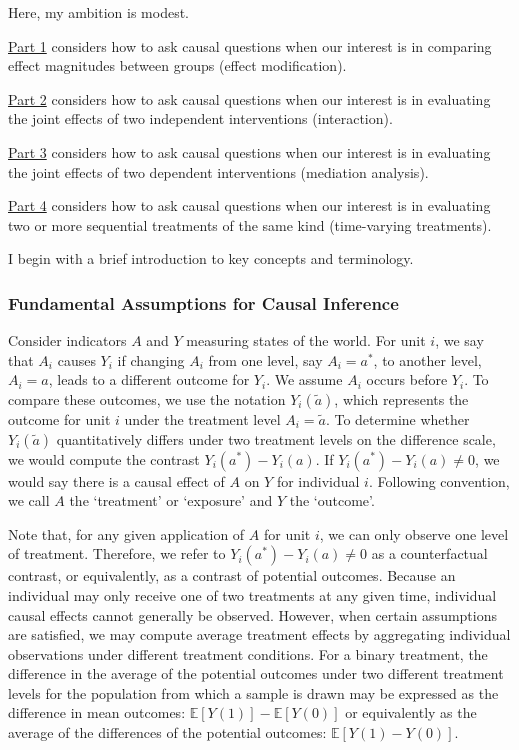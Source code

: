 \documentclass[
  single column]{article}
\begin{document}
Here, my ambition is modest.

\hyperref[id-sec-1]{Part 1} considers how to ask causal questions when
our interest is in comparing effect magnitudes between groups (effect
modification).

\hyperref[id-sec-2]{Part 2} considers how to ask causal questions when
our interest is in evaluating the joint effects of two independent
interventions (interaction).

\hyperref[id-sec-3]{Part 3} considers how to ask causal questions when
our interest is in evaluating the joint effects of two dependent
interventions (mediation analysis).

\hyperref[id-sec-4]{Part 4} considers how to ask causal questions when
our interest is in evaluating two or more sequential treatments of the
same kind (time-varying treatments).

I begin with a brief introduction to key concepts and terminology.

\subsubsection{Fundamental Assumptions for Causal
Inference}\label{fundamental-assumptions-for-causal-inference}

Consider indicators \(A\) and \(Y\) measuring states of the world. For
unit \(i\), we say that \(A_i\) causes \(Y_i\) if changing \(A_i\) from
one level, say \(A_i = a^*\), to another level, \(A_i = a\), leads to a
different outcome for \(Y_i\). We assume \(A_i\) occurs before \(Y_i\).
To compare these outcomes, we use the notation \(Y_i(\tilde{a})\), which
represents the outcome for unit \(i\) under the treatment level
\(A_i = \tilde{a}\). To determine whether \(Y_i(\tilde{a})\)
quantitatively differs under two treatment levels on the difference
scale, we would compute the contrast \(Y_i(a^*) - Y_i(a)\). If
\(Y_i(a^*) - Y_i(a) \neq 0\), we would say there is a causal effect of
\(A\) on \(Y\) for individual \(i\). Following convention, we call \(A\)
the `treatment' or `exposure' and \(Y\) the `outcome'.

Note that, for any given application of \(A\) for unit \(i\), we can
only observe one level of treatment. Therefore, we refer to
\(Y_i(a^*) - Y_i(a) \neq 0\) as a counterfactual contrast, or
equivalently, as a contrast of potential outcomes. Because an individual
may only receive one of two treatments at any given time, individual
causal effects cannot generally be observed. However, when certain
assumptions are satisfied, we may compute average treatment effects by
aggregating individual observations under different treatment
conditions. For a binary treatment, the difference in the average of the
potential outcomes under two different treatment levels for the
population from which a sample is drawn may be expressed as the
difference in mean outcomes: \(\mathbb{E}[Y(1)] - \mathbb{E}[Y(0)]\) or
equivalently as the average of the differences of the potential
outcomes: \(\mathbb{E}[Y(1) - Y(0)]\).
\end{document}
